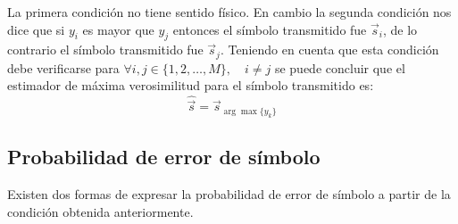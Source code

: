 \documentclass{article}
\begin{document}
    La primera condición no tiene sentido físico. En cambio la segunda condición
    nos dice que si $y_i$ es mayor que $y_j$ entonces el símbolo transmitido fue $\vec{s}_i$,
    de lo contrario el símbolo transmitido fue $\vec{s}_j$. Teniendo en cuenta que esta condición 
    debe verificarse para $\forall i,j \in \{1,2,\dots,M\}, \quad i\neq j$ se puede concluir que
    el estimador de máxima verosimilitud para el símbolo transmitido es: 
    \begin{equation}
        \hat{\vec{s}} = \vec{s}_{\arg \max \{y_k\}}
    \end{equation}


    \subsection{Probabilidad de error de símbolo}
        Existen dos formas de expresar la probabilidad de error de símbolo a partir de la condición
        obtenida anteriormente.
\end{document}
